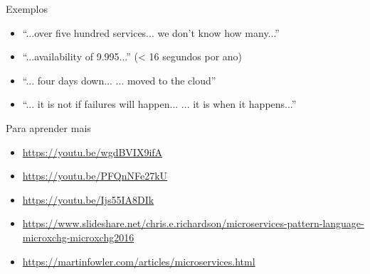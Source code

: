 \begin{frame}{Exemplos}
\begin{itemize}
	\item ``...over five hundred services... we don't know how many...''
	\item ``...availability of 9.995...'' (< 16 segundos por ano)
	\item ``... four days down... ... moved to the cloud''
	\item ``... it is not if failures will happen... ... it is when it happens...'' 
\end{itemize}

\end{frame}

\begin{frame}{Para aprender mais}
\begin{itemize}
	\item \url{https://youtu.be/wgdBVIX9ifA}
	\item \url{https://youtu.be/PFQnNFe27kU}
	\item \url{https://youtu.be/Ijs55IA8DIk}
	\item \url{https://www.slideshare.net/chris.e.richardson/microservices-pattern-language-microxchg-microxchg2016}
	\item \url{https://martinfowler.com/articles/microservices.html}
	
\end{itemize}
\end{frame}
